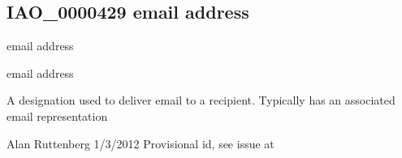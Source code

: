 \documentclass[letterpaper,10pt,english]{sphinxmanual}
\begin{document}
\begin{sphinxShadowBox}

\sphinxAtStartPar
{}
\end{sphinxShadowBox}
\begin{quote}

\ignorespaces \end{quote}


\subsection{IAO\_0000429 \sphinxhyphen{} email address}
\label{\detokenize{doc-IAO_0000429:iao-0000429-email-address}}\label{\detokenize{doc-IAO_0000429:index-0}}\label{\detokenize{doc-IAO_0000429::doc}}
\begin{sphinxShadowBox}

\sphinxAtStartPar
email address
\end{sphinxShadowBox}

\begin{sphinxShadowBox}

\sphinxAtStartPar
email address
\end{sphinxShadowBox}

\begin{sphinxShadowBox}

\sphinxAtStartPar
{\hyperref[\detokenize{doc-IAO_0000030::doc}]{}}
\end{sphinxShadowBox}

\begin{sphinxShadowBox}

\sphinxAtStartPar
A designation used to deliver email to a recipient.  Typically has an associated email representation
\end{sphinxShadowBox}

\begin{sphinxShadowBox}

\sphinxAtStartPar
Alan Ruttenberg 1/3/2012 \sphinxhyphen{} Provisional id, see issue at 
\end{sphinxShadowBox}
\end{document}
